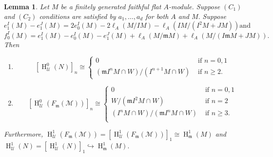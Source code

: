 \documentclass[11pt,reqno]{amsart}
\newtheorem{lemma}[theorem]{Lemma}
\theoremstyle{definition}
\newcommand{\m}{\mathfrak m}
\def\U{{\mathcal U}}
\def\M{{\mathcal M}}
\DeclareMathOperator{\h}{H}
\numberwithin{equation}{section}
\begin{document}
\begin{lemma}\label{fiber-lemma-1}
 Let $M$ be a finitely generated faithful flat $A$-module. Suppose $(C_1)$ and $(C_2)$ conditions are satisfied by $a_1,\ldots,a_d$ for both $A$ and $M.$ Suppose
 \begin{equation}\label{the-theorem-2-condition1}
   e_1^I(M)-e_1^J(M)=2e_0^I(M)-2\ell_A(M/IM)-\ell_A(IM/(I^2M+JM)) \text{and}  
 \end{equation}
 \begin{equation}\label{the-theorem-2-condition2}
     f_0^I(M)= e_1^I(M)-e_0^I(M)-e_1^J(M)+\ell_A(M/\m M)+\ell_A(M/(I\m M+JM)).
 \end{equation}
  Then  
 \begin{enumerate}
 	\item\label{1} $$[\h^0_\mathcal{U}(N)]_n\cong \begin{cases}
 		0 &\mbox{ if } n= 0,1\\
 		(\m I^nM\cap W)/(I^{n+1}M\cap W)
 		&\mbox{ if } n\geq 2.
 	\end{cases} $$
\item \label{2}
 $$[\h^0_\mathcal{U}(F_\m(\M))]_n\cong \begin{cases}
 	0 &\mbox{ if } n= 0,1\\
 	W/(\m I^2M\cap W) &\mbox{ if } n=2\\
 	(I^nM\cap W)/(\m I^{n}M\cap W) &\mbox{ if } n\geq 3.\\
\end{cases}$$
\end{enumerate}
Furthermore, $\h^1_\mathcal{U}(F_{\m}(\M))=[\h^1_\mathcal{U}(F_\m(\M))]_{1}\cong \h_\m^1(M)$ and $\h^1_\U(N)=[\h^1_\U(N)]_1\hookrightarrow \h^1_\m(M).$ 
\end{lemma}
\end{document}
